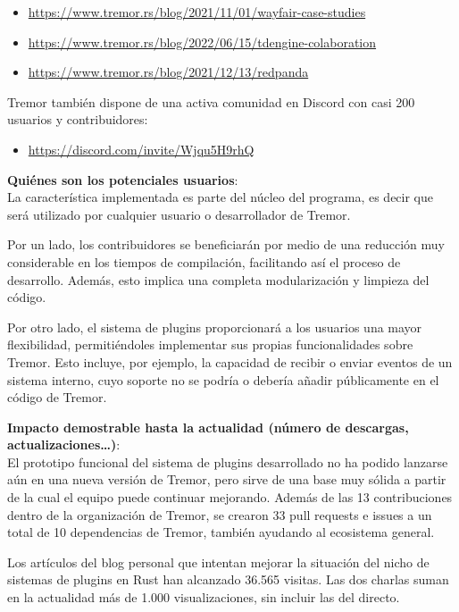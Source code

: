 \documentclass[a4paper,12pt,twoside,hidelinks,openright]{article}
\begin{document}
\begin{itemize}
    \item \url{https://www.tremor.rs/blog/2021/11/01/wayfair-case-studies}
    \item \url{https://www.tremor.rs/blog/2022/06/15/tdengine-colaboration}
    \item \url{https://www.tremor.rs/blog/2021/12/13/redpanda}
\end{itemize}

Tremor también dispone de una activa comunidad en Discord con casi 200 usuarios
y contribuidores:

\begin{itemize}
    \item \url{https://discord.com/invite/Wjqu5H9rhQ}
\end{itemize}

\textbf{Quiénes son los potenciales usuarios}:\\
La característica implementada es parte del núcleo del programa, es decir que
será utilizado por cualquier usuario o desarrollador de Tremor.

Por un lado, los contribuidores se beneficiarán por medio de una reducción muy
considerable en los tiempos de compilación, facilitando así el proceso de
desarrollo. Además, esto implica una completa modularización y limpieza del
código.

Por otro lado, el sistema de plugins proporcionará a los usuarios una mayor
flexibilidad, permitiéndoles implementar sus propias funcionalidades sobre
Tremor. Esto incluye, por ejemplo, la capacidad de recibir o enviar eventos de
un sistema interno, cuyo soporte no se podría o debería añadir públicamente en
el código de Tremor.

\textbf{Impacto demostrable hasta la actualidad (número de descargas,
actualizaciones…)}:\\
El prototipo funcional del sistema de plugins desarrollado no ha podido lanzarse
aún en una nueva versión de Tremor, pero sirve de una base muy sólida a partir
de la cual el equipo puede continuar mejorando. Además de las 13 contribuciones
dentro de la organización de Tremor, se crearon 33 pull requests e issues a un
total de 10 dependencias de Tremor, también ayudando al ecosistema general.

Los artículos del blog personal que intentan mejorar la situación del nicho de
sistemas de plugins en Rust han alcanzado 36.565 visitas. Las dos charlas suman
en la actualidad más de 1.000 visualizaciones, sin incluir las del directo.
\end{document}
